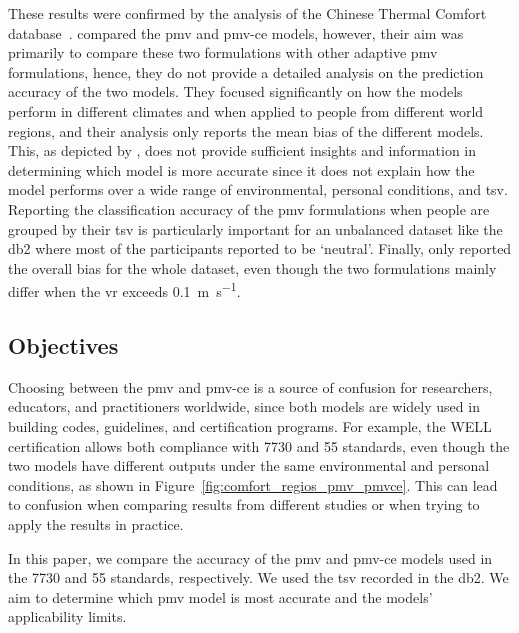These results were confirmed by the analysis of the Chinese Thermal Comfort database~\cite{du_evaluation_2022}.
 compared the \ac{pmv} and \ac{pmv-ce} models, however, their aim was primarily to compare these two formulations with other adaptive \ac{pmv} formulations, hence, they do not provide a detailed analysis on the prediction accuracy of the two models.
They focused significantly on how the models perform in different climates and when applied to people from different world regions, and their analysis only reports the mean bias of the different models.
This, as depicted by , does not provide sufficient insights and information in determining which model is more accurate since it does not explain how the model performs over a wide range of environmental, personal conditions, and \ac{tsv}.
Reporting the classification accuracy of the \ac{pmv} formulations when people are grouped by their \ac{tsv} is particularly important for an unbalanced dataset like the \ac{db2} where most of the participants reported to be `neutral'.
Finally,  only reported the overall bias for the whole dataset, even though the two formulations mainly differ when the \ac{vr} exceeds \qty{0.1}{\m\per\s}.

\subsection{Objectives}\label{subsec:aim-and-objectives}
Choosing between the \ac{pmv} and \ac{pmv-ce} is a source of confusion for researchers, educators, and practitioners worldwide, since both models are widely used in building codes, guidelines, and certification programs.
For example, the WELL certification allows both compliance with \gls{7730} and \gls{55} standards, even though the two models have different outputs under the same environmental and personal conditions, as shown in Figure~\ref{fig:comfort_regios_pmv_pmvce}.
This can lead to confusion when comparing results from different studies or when trying to apply the results in practice.

In this paper, we compare the accuracy of the \ac{pmv} and \ac{pmv-ce} models used in the \gls{7730} and \gls{55} standards, respectively.
We used the \ac{tsv} recorded in the \acf{db2}.
We aim to determine which \ac{pmv} model is most accurate and the models' applicability limits.